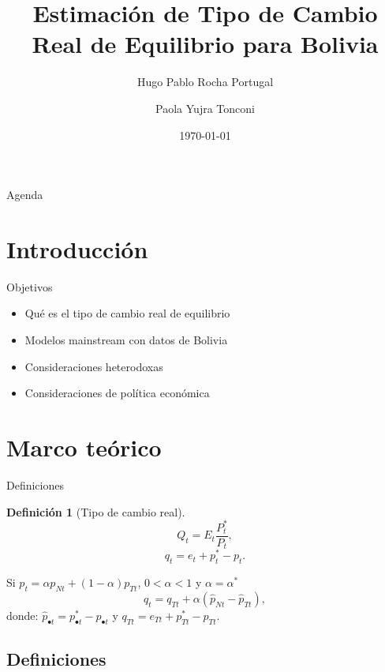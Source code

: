 \documentclass[12pt]{beamer}
\title{Estimación de Tipo de Cambio Real de Equilibrio para Bolivia}
\author{Hugo Pablo Rocha Portugal \and Paola Yujra Tonconi}
\date{\today}
\newtheorem{definic}{Definición}[section]
\begin{document}
\begin{frame}
\titlepage
\end{frame}

\begin{frame}{Agenda}
\begin{multicols}{2}
\tableofcontents
\end{multicols}
\end{frame}

\section[Introducción]{Introducción}

\begin{frame}{Objetivos}
\begin{itemize}
\item Qué es el tipo de cambio real de equilibrio
\item Modelos mainstream con datos de Bolivia
\item Consideraciones heterodoxas 
\item Consideraciones de política económica
\end{itemize}
\end{frame}

\section[Marco teórico]{Marco teórico}

\begin{frame}{Definiciones}
\begin{definic}[Tipo de cambio real]
\begin{equation}\label{tcr1}
Q_t=E_t\frac{P_t^*}{P_t},
\end{equation}
\begin{equation}\label{tcrlog}
q_t=e_t+p_t^*-p_t.
\end{equation}
\end{definic}
Si $p_t=\alpha p_{Nt} + (1-\alpha) p_{Tt}$, $0<\alpha<1$ y $\alpha=\alpha^*$
\begin{equation}\label{tcr2}
q_t=q_{Tt}+\alpha(\hat{p}_{Nt}-\hat{p}_{Tt}),
\end{equation}
donde: $\hat{p}_{\bullet t}=p_{\bullet t}^*-p_{\bullet t}$ y $q_{Tt}=e_{Tt}+p_{Tt}^*-p_{Tt}$.
\end{frame}

\subsection[Definiciones]{Definiciones}
\end{document}
